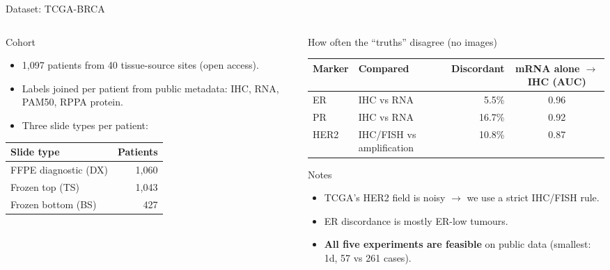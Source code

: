 \documentclass[aspectratio=169,10pt]{beamer}
\begin{document}
\begin{frame}[t]{Dataset: TCGA-BRCA}
\footnotesize
\begin{columns}[T]
\begin{column}{0.44\textwidth}
\begin{block}{Cohort}
\begin{itemize}
  \item 1,097 patients from 40 tissue-source sites (open access).
  \item Labels joined per patient from public metadata: IHC, RNA, PAM50, RPPA protein.
  \item Three slide types per patient:
\end{itemize}
\end{block}
\centering
\begin{tabular}{lr}
\toprule
Slide type & Patients \\
\midrule
FFPE diagnostic (DX) & 1,060 \\
Frozen top (TS) & 1,043 \\
Frozen bottom (BS) & 427 \\
\bottomrule
\end{tabular}
\end{column}
\begin{column}{0.52\textwidth}
\begin{block}{How often the ``truths'' disagree (no images)}
\centering
\scriptsize
\begin{tabular}{llrc}
\toprule
Marker & Compared & Discordant & mRNA alone $\rightarrow$ IHC (AUC) \\
\midrule
ER & IHC vs RNA & 5.5\% & 0.96 \\
PR & IHC vs RNA & 16.7\% & 0.92 \\
HER2 & IHC/FISH vs amplification & 10.8\% & 0.87 \\
\bottomrule
\end{tabular}
\end{block}
\begin{block}{Notes}
\begin{itemize}
  \item TCGA's HER2 field is noisy $\rightarrow$ we use a strict IHC/FISH rule.
  \item ER discordance is mostly ER-low tumours.
  \item \textbf{All five experiments are feasible} on public data (smallest: 1d, 57 vs 261 cases).
\end{itemize}
\end{block}
\end{column}
\end{columns}
\end{frame}
\end{document}
